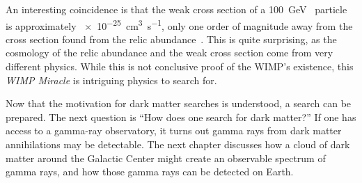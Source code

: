 An interesting coincidence is that the weak cross section of a \SI{100}{\GeV{}} particle is approximately \SI{e-25}{cm^3s^{-1}}, only one order of magnitude away from the cross section found from the relic abundance~\cite{Jungman:1995df}.
This is quite surprising, as the cosmology of the relic abundance and the weak cross section come from very different physics.
While this is not conclusive proof of the WIMP's existence, this \textit{WIMP Miracle} is intriguing physics to search for.

Now that the motivation for dark matter searches is understood, a search can be prepared.
The next question is ``How does one search for dark matter?''
If one has access to a gamma-ray observatory, it turns out gamma rays from dark matter annihilations may be detectable.
The next chapter discusses how a cloud of dark matter around the Galactic Center might create an observable spectrum of gamma rays, and how those gamma rays can be detected on Earth.


